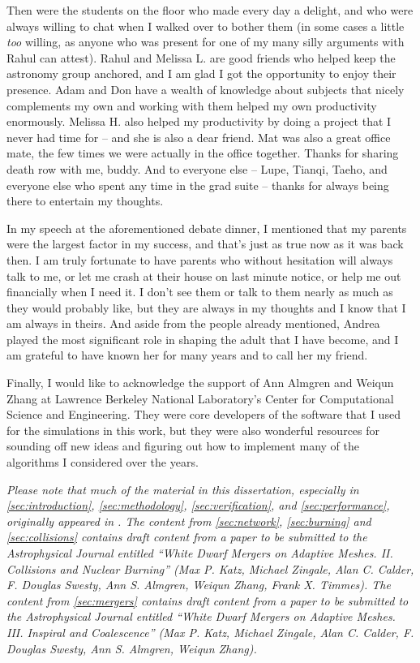 \documentclass[12pt]{article}
\begin{document}
Then were the students on the floor who made every day a delight, and who
were always willing to chat when I walked over to bother them (in some cases
a little \textit{too} willing, as anyone who was present for one of my many
silly arguments with Rahul can attest). Rahul and Melissa L. are good friends 
who helped keep the astronomy group anchored, and I am glad I got the 
opportunity to enjoy their presence. Adam and Don have a wealth of knowledge 
about subjects that nicely complements my own and working with them helped my 
own productivity enormously. Melissa H. also helped my productivity by doing 
a project that I never had time for -- and she is also a dear friend. Mat 
was also a great office mate, the few times we were actually in the office 
together. Thanks for sharing death row with me, buddy. And to everyone else
-- Lupe, Tianqi, Taeho, and everyone else who spent any time in the grad 
suite -- thanks for always being there to entertain my thoughts.

In my speech at the aforementioned debate dinner, I mentioned that my 
parents were the largest factor in my success, and that's just as true 
now as it was back then. I am truly fortunate to have parents who without 
hesitation will always talk to me, or let me crash at their house on 
last minute notice, or help me out financially when I need it. I don't 
see them or talk to them nearly as much as they would probably like, 
but they are always in my thoughts and I know that I am always in theirs.
And aside from the people already mentioned, Andrea played the most significant 
role in shaping the adult that I have become, and I am grateful to have known 
her for many years and to call her my friend.

Finally, I would like to acknowledge the support of Ann Almgren and Weiqun 
Zhang at Lawrence Berkeley National Laboratory's Center for Computational 
Science and Engineering. They were core developers of the software that 
I used for the simulations in this work, but they were also wonderful resources 
for sounding off new ideas and figuring out how to implement many of the 
algorithms I considered over the years.

\textit{Please note that much of the material in this dissertation, especially in
\autoref{sec:introduction}, \autoref{sec:methodology}, \autoref{sec:verification},
and \autoref{sec:performance}, originally appeared in \cite{wdmergerI}. The content
from \autoref{sec:network}, \autoref{sec:burning} and \autoref{sec:collisions} contains draft content from
a paper to be submitted to the Astrophysical Journal entitled ``White Dwarf Mergers on
Adaptive Meshes. II. Collisions and Nuclear Burning'' (Max P. Katz, Michael Zingale,
Alan C. Calder, F. Douglas Swesty, Ann S. Almgren, Weiqun Zhang, Frank X. Timmes).
The content from \autoref{sec:mergers} contains draft content from a paper to be
submitted to the Astrophysical Journal entitled ``White Dwarf Mergers on Adaptive
Meshes. III. Inspiral and Coalescence'' (Max P. Katz, Michael Zingale, Alan C. Calder,
F. Douglas Swesty, Ann S. Almgren, Weiqun Zhang).}
\end{document}
